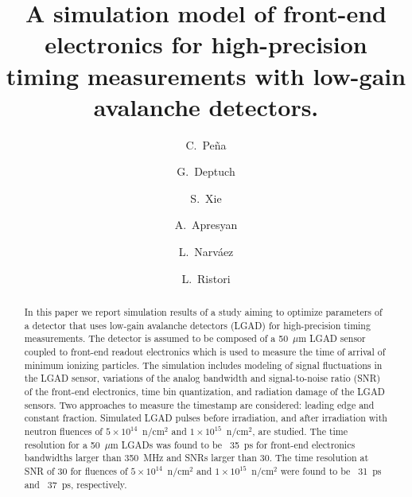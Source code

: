 \documentclass[preprint,1p]{elsarticle}
\begin{document}
\linenumbers

\begin{frontmatter}



\title{A simulation model of front-end electronics for high-precision timing measurements with low-gain avalanche detectors.}


\author[1,2]{C.~Pe\~na}
\author[1]{G.~Deptuch}
\author[2]{S.~Xie}
\author[1]{A.~Apresyan}
\author[2]{L.~Narv\'aez}
\author[1]{L.~Ristori}

\address[1]{Fermi National Accelerator Laboratory, Batavia, IL, USA}
\address[2]{California Institute of Technology, Pasadena, CA, USA}

\begin{abstract}
In this paper we report simulation results of a study aiming to optimize 
parameters of a detector that uses low-gain avalanche detectors (LGAD) for
high-precision timing measurements. The detector is assumed to be composed of a
50~$\mu$m LGAD sensor coupled to front-end readout electronics which is used to
measure the time of arrival of minimum ionizing particles. The simulation
includes modeling of signal fluctuations in the LGAD sensor, variations of the analog
bandwidth and signal-to-noise ratio (SNR) of the front-end electronics, time
bin quantization, and radiation damage of the LGAD sensors. Two approaches to
measure the timestamp are considered: leading edge and constant fraction.
Simulated LGAD pulses before irradiation, and after irradiation with 
neutron fluences of $5\times 10^{14}$~n/cm$^2$ and $1\times 10^{15}$~n/cm$^2$,
are studied. The time resolution for a 50~$\mu$m LGADs was found to be ~35~\si{ps}
for front-end electronics bandwidths larger than 350~\si{MHz} and SNRs larger
than 30. The time resolution at SNR of 30 for fluences of $5\times
10^{14}$~n/cm$^2$ and $1\times 10^{15}$~n/cm$^2$ were found to be ~31~\si{ps}
and ~37~\si{ps}, respectively. 
\end{abstract}


\end{frontmatter}
\end{document}
